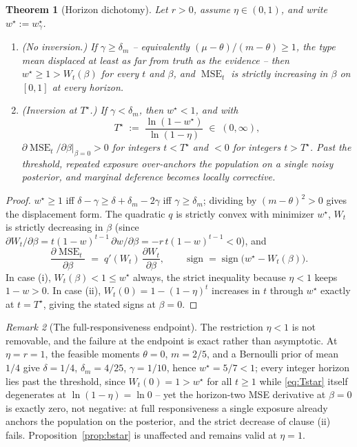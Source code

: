 \documentclass[11pt]{article}
\newtheorem{theorem}{Theorem}[section]
\theoremstyle{definition}
\theoremstyle{remark}
\newtheorem{remark}[theorem]{Remark}
\numberwithin{equation}{section}
\DeclareMathOperator{\MSE}{MSE}
\begin{document}
\begin{theorem}[Horizon dichotomy]\label{thm:horizon}
Let $r > 0$, assume $\eta \in (0,1)$, and write $w^\star := w^\star_\gamma$.
\begin{enumerate}
\item[(i)] (\emph{No inversion.}) If $\gamma \ge \delta_m$ -- equivalently $(\mu-\theta)/(m-\theta) \ge 1$, the type mean displaced at least as far from truth as the evidence -- then $w^\star \ge 1 > W_t(\beta)$ for every $t$ and $\beta$, and $\MSE_t$ is strictly increasing in $\beta$ on $[0,1]$ at every horizon.
\item[(ii)] (\emph{Inversion at $T^\star$.}) If $\gamma < \delta_m$, then $w^\star < 1$, and with
\begin{equation}\label{eq:Tstar}
T^\star \;:=\; \frac{\ln(1-w^\star)}{\ln(1-\eta)} \;\in\; (0,\infty),
\end{equation}
$\partial\MSE_t/\partial\beta|_{\beta=0} > 0$ for integers $t < T^\star$ and $< 0$ for integers $t > T^\star$. Past the threshold, repeated exposure over-anchors the population on a single noisy posterior, and marginal deference becomes locally corrective.
\end{enumerate}
\end{theorem}
\begin{proof}
$w^\star \ge 1$ iff $\delta - \gamma \ge \delta + \delta_m - 2\gamma$ iff $\gamma \ge \delta_m$; dividing by $(m-\theta)^2 > 0$ gives the displacement form. The quadratic $q$ is strictly convex with minimizer $w^\star$, $W_t$ is strictly decreasing in $\beta$ (since $\partial W_t/\partial\beta = t(1-w)^{t-1}\,\partial w/\partial\beta = -r\,t(1-w)^{t-1} < 0$), and
\[
\frac{\partial \MSE_t}{\partial\beta} \;=\; q'(W_t)\,\frac{\partial W_t}{\partial\beta},
\qquad \operatorname{sign} = \operatorname{sign}\bigl(w^\star - W_t(\beta)\bigr).
\]
In case (i), $W_t(\beta) < 1 \le w^\star$ always, the strict inequality because $\eta < 1$ keeps $1 - w > 0$. In case (ii), $W_t(0) = 1-(1-\eta)^t$ increases in $t$ through $w^\star$ exactly at $t = T^\star$, giving the stated signs at $\beta = 0$.
\end{proof}

\begin{remark}[The full-responsiveness endpoint]\label{rem:etaone}
The restriction $\eta < 1$ is not removable, and the failure at the endpoint is exact rather than asymptotic. At $\eta = r = 1$, the feasible moments $\theta = 0$, $m = 2/5$, and a Bernoulli prior of mean $1/4$ give $\delta = 1/4$, $\delta_m = 4/25$, $\gamma = 1/10$, hence $w^\star = 5/7 < 1$; every integer horizon lies past the threshold, since $W_t(0) = 1 > w^\star$ for all $t \ge 1$ while \eqref{eq:Tstar} itself degenerates at $\ln(1-\eta) = \ln 0$ -- yet the horizon-two MSE derivative at $\beta = 0$ is exactly zero, not negative: at full responsiveness a single exposure already anchors the population on the posterior, and the strict decrease of clause (ii) fails. Proposition~\ref{prop:bstar} is unaffected and remains valid at $\eta = 1$.
\end{remark}
\end{document}
